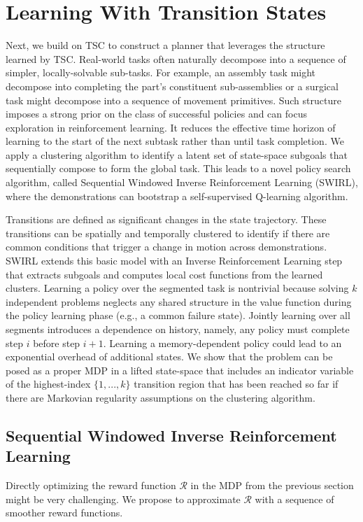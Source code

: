 \section{Learning With Transition States}
\label{swirl}
Next, we build on TSC to construct a planner that leverages the structure learned by TSC.
Real-world tasks often naturally decompose into a sequence of simpler, locally-solvable sub-tasks.
For example, an assembly task might decompose into completing the part's constituent sub-assemblies or a surgical task might decompose into a sequence of movement primitives.
Such structure imposes a strong prior on the class of successful policies and can focus exploration in reinforcement learning.
It reduces the effective time horizon of learning to the start of the next subtask rather than until task completion.
We apply a clustering algorithm to identify a latent set of state-space subgoals that sequentially compose to form the global task.
This leads to a novel policy search algorithm, called Sequential Windowed Inverse Reinforcement Learning (SWIRL),  where the demonstrations can bootstrap a self-supervised Q-learning algorithm.

 Transitions are defined as significant changes in the state trajectory. These transitions can be spatially and temporally clustered to identify if there are common conditions that trigger a change in motion across demonstrations.
SWIRL extends this basic model with an Inverse Reinforcement Learning step that extracts subgoals and computes local cost functions from the learned clusters. 
Learning a policy over the segmented task is nontrivial because solving $k$ independent problems neglects any shared structure in the value function during the policy learning phase (e.g., a common failure state).
Jointly learning over all segments introduces a dependence on history, namely, any policy must complete step $i$ before step $i+1$.
Learning a memory-dependent policy could lead to an exponential overhead of additional states. 
We show that the problem can be posed as a proper MDP in a lifted state-space that includes an indicator variable of the highest-index $\{1,...,k\}$ transition region that has been reached so far if there are Markovian regularity assumptions on the clustering algorithm.

\subsection{Sequential Windowed Inverse Reinforcement Learning}
Directly optimizing the reward function $\mathcal{R}$ in the MDP from the previous section might be very challenging.
We propose to approximate $\mathcal{R}$ with a sequence of smoother reward functions.

